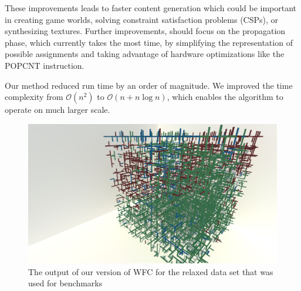 \documentclass[shortabstract, english, inz]{iithesis}
\begin{document}
These improvements leads to faster content generation which could be important in creating game worlds, solving constraint satisfaction problems (CSPs), or synthesizing textures. Further improvements, should focus on the propagation phase, which currently takes the most time, by simplifying the representation of possible assignments and taking advantage of hardware optimizations like the POPCNT instruction.

Our method reduced run time by an order of magnitude. We improved the time complexity from \(\mathcal{O}(n^2)\) to \(\mathcal{O}(n + n\log{n})\), which enables the algorithm to operate on much larger scale.
\begin{figure}[H]
\centering
\includegraphics[width=1\textwidth, angle=0]{images/original_output.png}
\caption{The output of our version of WFC for the relaxed data set that was used for benchmarks}
\end{figure}

\printbibliography[sorting=none]
\end{document}
